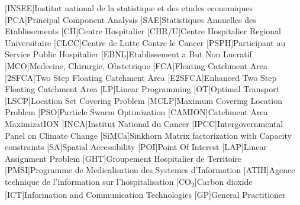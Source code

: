 \begin{multicols}{2}

\begin{acronym}
        [INSEE]{Institut national de la statistique et des etudes economiques}
        [PCA]{Principal Component Analysis}
        [SAE]{Statistiques Annuelles des Etablissements}
        [CH]{Centre Hospitalier}
        [CHR/U]{Centre Hospitalier Regional \/ Universitaire}
        [CLCC]{Centre de Lutte Contre le Cancer}
        [PSPH]{Participant au Service Public Hospitalier }
        [EBNL]{Etablissement a But Non Lucratif}
        [MCO]{Medecine, Chirurgie, Obstetrique}
        [FCA]{Floating Catchment Area}
        [2SFCA]{Two Step Floating Catchment Area}
        [E2SFCA]{Enhanced Two Step Floating Catchment Area}
        [LP]{Linear Programming}
        [OT]{Optimal Transport}
        [LSCP]{Location Set Covering Problem}
        [MCLP]{Maximum Covering Location Problem}
        [PSO]{Particle Swarm Optimization}
        [CAMION]{Catchment Area MaximizatION}
        [INCA]{Institut National du Cancer}
        [IPCC]{Intergovernmental Panel on Climate Change}
        [SiMCa]{Sinkhorn Matrix factorization with Capacity constraints}
        [SA]{Spatial Accessibility}
        [POI]{Point Of Interest}
        [LAP]{Linear Assignment Problem}
        [GHT]{Groupement Hospitalier de Territoire}
        [PMSI]{Programme de Medicalisation des Systemes d'Information}
        [ATIH]{Agence technique de l'information sur l'hospitalisation}
        [CO\textsubscript{2}]{Carbon dioxide}
        [ICT]{Information and Communication Technologies}
        [GP]{General Practitioner}

\end{acronym}

\end{multicols}

